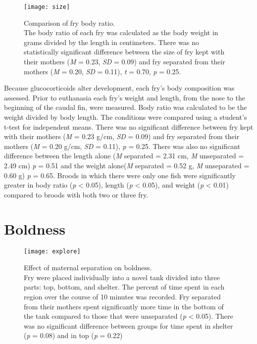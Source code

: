 \documentclass[12pt,twoside]{reedthesis}
\begin{document}
\begin{figure}[htbp] 
\begin{center} 
\texttt{[image: size]}
\caption[Comparison of fry size]{\footnotesize{Comparison of fry body
      ratio. \\ The body ratio of each fry
    was calculated as the body weight in grams divided by the length in
    centimeters. There was no
    statistically significant difference between the size of fry kept with their
    mothers (\textit{M} = 0.23, \textit{SD} = 0.09) and fry separated from their
  mothers (\textit{M} = 0.20, \textit{SD} = 0.11), \textit{t} = 0.70, \textit{p}
= 0.25}.}
\label{subd}
\end{center} 
\end{figure}

Because glucocorticoids alter development, each
fry's body
composition was assessed. Prior to euthanasia each fry's weight and length, from the nose to the beginning of
the caudal fin, were measured. 
Body ratio was calculated to be the weight divided by body length. The conditions were
compared using a student's t-test for independent means. There was no
significant difference between fry kept with their mothers (\textit{M} = 0.23 g/cm,
\textit{SD} = 0.09) and fry separated from their mothers (\textit{M} = 0.20 g/cm,
\textit{SD} = 0.11), \textit{p} = 0.25. There was also no
significant difference between the length alone (\textit{M} separated = 2.31 cm,
\textit{M} unseparated = 2.49 cm) \textit{p} = 0.51 and the weight
alone(\textit{M} separated = 0.52 g, \textit{M} unseparated = 0.60 g) \textit{p}
= 0.65. Broods in which there were only one fish were significantly greater in
body ratio (\textit{p} < 0.05), length (\textit{p} < 0.05), and weight
(\textit{p} < 0.01) compared to broods with both two or three fry.

\section{Boldness}

\begin{figure}[htbp] 
\begin{center} 
\texttt{[image: explore]}
\caption[Effect of maternal separation on boldness]{\footnotesize{Effect of
    maternal separation on boldness.\\ Fry were placed individually into a novel tank
    divided into three parts: top, bottom, and shelter. The percent of time
    spent in each region over the course of 10 minutes was recorded. Fry
    separated from their mothers spent significantly more time in the bottom of
    the tank compared to those that were unseparated (\textit{p} < 0.05). There was
    no significant difference between groups for time spent in shelter
    (\textit{p} = 0.08) and in top (\textit{p} = 0.22)}}
\label{subd}
\end{center} 
\end{figure}
\end{document}
